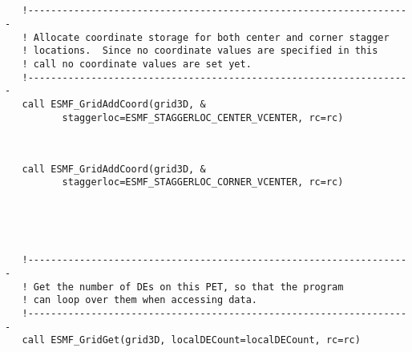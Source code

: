 
 \begin{verbatim}
        

   !-------------------------------------------------------------------
   ! Allocate coordinate storage for both center and corner stagger
   ! locations.  Since no coordinate values are specified in this
   ! call no coordinate values are set yet.
   !-------------------------------------------------------------------
   call ESMF_GridAddCoord(grid3D, &
          staggerloc=ESMF_STAGGERLOC_CENTER_VCENTER, rc=rc)
 
\end{verbatim}
 

 \begin{verbatim}

   call ESMF_GridAddCoord(grid3D, &
          staggerloc=ESMF_STAGGERLOC_CORNER_VCENTER, rc=rc)
 
\end{verbatim}
 

 \begin{verbatim}



   !-------------------------------------------------------------------
   ! Get the number of DEs on this PET, so that the program
   ! can loop over them when accessing data.
   !-------------------------------------------------------------------
   call ESMF_GridGet(grid3D, localDECount=localDECount, rc=rc)
 
\end{verbatim}
 

